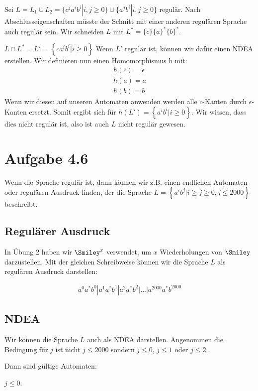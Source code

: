 \documentclass{article}
\begin{document}
Sei $L = L_1 \cup L_2 = \{c^ja^ib^i | i,j \geq 0 \} \cup \{ a^jb^i |i,j \geq 0 \}$ regulär. Nach Abschlusseigenschaften müsste der Schnitt mit einer anderen regulären Sprache auch regulär sein. Wir schneiden $L$ mit $L^*=\{c\}\{a\}^*\{b\}^*$.

$L\cap L^*=L'=\left\{ca^ib^i|i\geq0\right\}$ Wenn $L'$ regulär ist, können wir dafür einen NDEA erstellen. Wir definieren nun einen Homomorphismus h mit:
\begin{align}
h(c)=\epsilon\\
h(a)=a\\
h(b)=b
\end{align}
Wenn wir diesen auf unseren Automaten anwenden werden alle $c$-Kanten durch $\epsilon$-Kanten ersetzt. Somit ergibt sich für $h(L')=\left\{a^ib^i|i\geq0\right\}$. Wir wissen, dass dies nicht regulär ist, also ist auch $L$ nicht regulär gewesen.

\section*{Aufgabe 4.6}
Wenn die Sprache regulär ist, dann können wir z.B. einen endlichen Automaten oder regulären Ausdruck finden, der die Sprache $L = \left\{a^ib^j | i \geq j \geq 0, j \leq 2000 \right\}$ beschreibt.

\subsection*{Regulärer Ausdruck}
\begin{samepage}
In Übung 2 haben wir $\Smiley^x$ verwendet, um $x$ Wiederholungen von $\Smiley$ darzustellen. Mit der gleichen Schreibweise können wir die Sprache $L$ als regulären Ausdruck darstellen:

\begin{align*}
a^0a^*b^0|a^1a^*b^1|a^2a^*b^2|...|a^{2000}a^*b^{2000}
\end{align*}
\end{samepage}

\subsection*{NDEA}
Wir können die Sprache $L$ auch als NDEA darstellen. Angenommen die Bedingung für $j$ ist nicht $j \leq 2000$ sondern $j \leq 0$, $j\leq 1$ oder $j \leq 2$.

Dann sind gültige Automaten:

\begin{samepage}
$j \leq 0$:

\begin{center}
\end{center}
\end{samepage}
\end{document}

